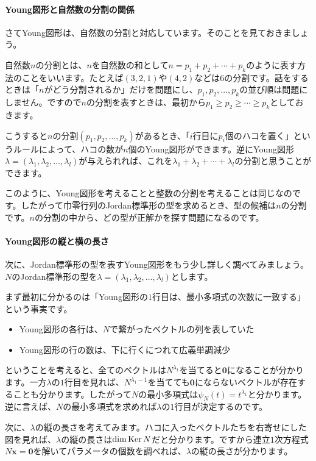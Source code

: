 \paragraph{Young図形と自然数の分割の関係}

さてYoung図形は、自然数の分割と対応しています。そのことを見ておきましょう。

自然数$n$の分割とは、$n$を自然数の和として$n = p_1 + p_2 + \cdots + p_k$のように表す方法のことをいいます。たとえば$(3, 2, 1)$や$(4, 2)$などは$6$の分割です。話をするときは「$n$がどう分割されるか」だけを問題にし、$p_1, p_2, \ldots, p_k$の並び順は問題にしません。ですので$n$の分割を表すときは、最初から$p_1 \geq p_2 \geq \cdots \geq p_k$としておきます。

こうすると$n$の分割$(p_1, p_2, \ldots, p_k)$があるとき、「$i$行目に$p_i$個のハコを置く」というルールによって、ハコの数が$n$個のYoung図形ができます。逆にYoung図形$\lambda = (\lambda_1, \lambda_2, \ldots, \lambda_l)$が与えられれば、これを$\lambda_1 + \lambda_2 + \cdots + \lambda_l$の分割と思うことができます。

このように、Young図形を考えることと整数の分割を考えることは同じなのです。したがって巾零行列のJordan標準形の型を求めるとき、型の候補は$n$の分割です。$n$の分割の中から、どの型が正解かを探す問題になるのです。

\paragraph{Young図形の縦と横の長さ}

次に、Jordan標準形の型を表すYoung図形をもう少し詳しく調べてみましょう。$N$のJordan標準形の型を$\lambda = (\lambda_1, \lambda_2, \ldots, \lambda_l)$とします。

まず最初に分かるのは「Young図形の$1$行目は、最小多項式の次数に一致する」という事実です。
\begin{itemize}
\item Young図形の各行は、$N$で繋がったベクトルの列を表していた
\item Young図形の行の数は、下に行くにつれて広義単調減少
\end{itemize}
ということを考えると、全てのベクトルは$N^{\lambda_1}$を当てると$\bm{0}$になることが分かります。一方$\lambda$の$1$行目を見れば、$N^{\lambda_1 - 1}$を当てても$\bm{0}$にならないベクトルが存在することも分かります。したがって$N$の最小多項式は$\psi_N(t) = t^{\lambda_1}$と分かります。逆に言えば、$N$の最小多項式を求めれば$\lambda$の$1$行目が決定するのです。

次に、$\lambda$の縦の長さを考えてみます。ハコに入ったベクトルたちを右寄せにした図を見れば、$\lambda$の縦の長さは$\dim \operatorname{Ker} N$だと分かります。ですから連立$1$次方程式$N\bm{x} = \bm{0}$を解いてパラメータの個数を調べれば、$\lambda$の縦の長さが分かります。

